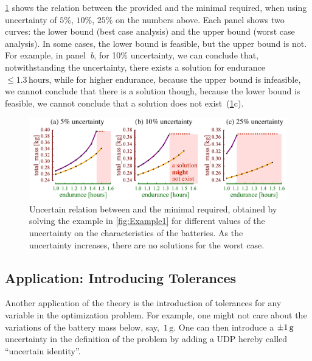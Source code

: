 \cref{fig:unc_battery_uncertain} shows the relation between
the provided  and the minimal  required,
when using uncertainty of $5\%$, $10\%$, $25\%$ on the numbers
above. Each panel shows two curves: the lower bound (best case analysis)
and the upper bound (worst case analysis). In some cases, the lower
bound is feasible, but the upper bound is not. For example, in panel~\emph{b},
for 10\% uncertainty, we can conclude that, notwithstanding the uncertainty,
there exists a solution for endurance~$\leq1.3\,\text{hours}$, while
for higher endurance, because the upper bound is infeasible, we cannot
conclude that there is a solution \textemdash{} though, because the
lower bound is feasible, we cannot conclude that a solution does not
exist~(\cref{fig:unc_battery_uncertain}c).
\begin{center}
    \begin{figure}[h]
        \begin{centering}
            \includegraphics[scale=0.33]{unc_battery_uncertain}
        \end{centering}
        \caption{Uncertain relation between 
        and the minimal  required, obtained by solving the
        example in \cref{fig:Example1} for different values of the uncertainty
        on the characteristics of the batteries. As the uncertainty increases,
            there are no solutions for the worst case.}
        \label{fig:unc_battery_uncertain}
    \end{figure}
\end{center}


\subsection{Application: Introducing Tolerances\label{sec:Application-tolerance}}

Another application of the theory is the introduction of tolerances
for any variable in the optimization problem. For example, one might
not care about the variations of the battery mass below, say,~$1\,\text{g}$.
One can then introduce a $\pm1\,\text{\ensuremath{\text{g}} }$ uncertainty
in the definition of the problem by adding a UDP hereby called ``uncertain
identity''.

